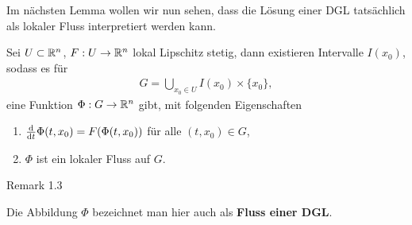 Im nächsten Lemma wollen wir nun sehen, dass die Lösung einer DGL tatsächlich als lokaler Fluss interpretiert werden kann.
\label{ode/fluesse:lemma-3}
\begin{lemma}{}{}



Sei \(U\subset\mathbb{R}^n\), \(F:U \rightarrow \mathbb{R}^n\) lokal Lipschitz stetig, dann existieren Intervalle \(I(x_0)\), sodass es für
\begin{align*}
G = \bigcup_{x_0\in U} I(x_0)\times\{x_0\},
\end{align*}
eine Funktion \(\Phi:G\rightarrow \mathbb{R}^n\) gibt, mit folgenden Eigenschaften
\begin{enumerate}

\item {} 
\(\frac{\mathrm{d}}{\mathrm{d} t} \Phi(t, x_0) = F(\Phi(t, x_0))\) für alle \((t,x_0)\in G\),

\item {} 
\(\Phi\) ist ein lokaler Fluss auf \(G\).

\end{enumerate}
\end{lemma}
\label{ode/fluesse:remark-4}
\begin{emphBox}{}{}{Remark 1.3}



Die Abbildung \(\Phi\) bezeichnet man hier auch als \textbf{Fluss einer DGL}.
\end{emphBox}

